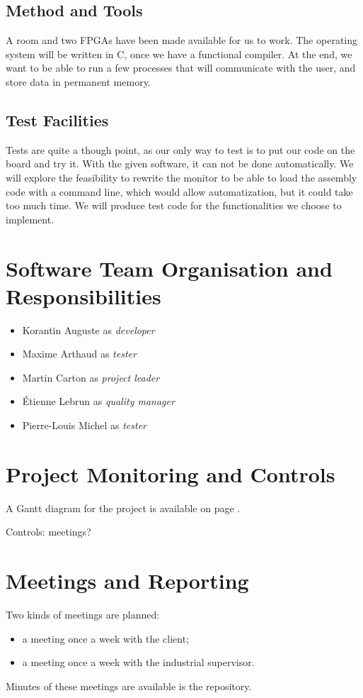 \documentclass{article}
\begin{document}
    \subsection{Method and Tools}
    A room and two FPGAs have been made available for us to work.
    The operating system will be written in C, once we have a functional
    compiler.
    At the end, we want to be able to run a few processes that will communicate
    with the user, and store data in permanent memory.

     \subsection{Test Facilities}
    Tests are quite a though point, as our only way to test is to put
    our code on the board and try it. With the given software, it can not be
    done automatically.
    We will explore the feasibility to rewrite the monitor to be able to load
    the assembly code with a command line, which would allow automatization, but
    it could take too much time.
    We will produce test code for the functionalities we choose to implement.

  \section{Software Team Organisation and Responsibilities}
    \begin{itemize}
      \item Korantin Auguste as \textit{developer}
      \item Maxime Arthaud as \textit{tester}
      \item Martin Carton as \textit{project leader}
      \item Étienne Lebrun as \textit{quality manager}
      \item Pierre-Louis Michel as \textit{tester}
    \end{itemize}

  \section{Project Monitoring and Controls}
    A Gantt diagram for the project is available on page \pageref{fig:gantt}.

    Controls: meetings?


  \section{Meetings and Reporting}
    Two kinds of meetings are planned:
    \begin{itemize}
        \item a meeting once a week with the client;
        \item a meeting once a week with the industrial supervisor.
    \end{itemize}
    Minutes of these meetings are available is the repository.
\end{document}
